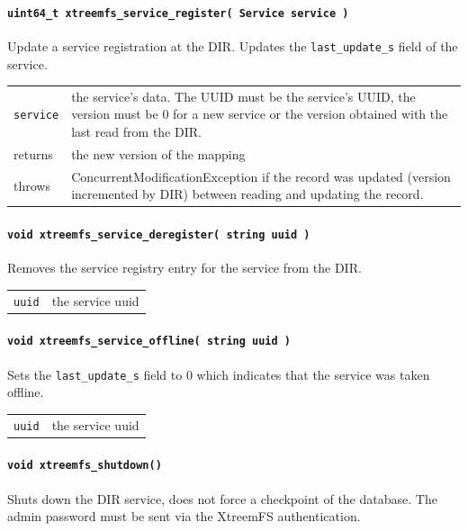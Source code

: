\paragraph{\texttt{uint64\_t xtreemfs\_service\_register( Service service~)}}
Update a service registration at the DIR. Updates the \texttt{last\_update\_s} field of the service.

\begin{tabularx}{\textwidth}{lX}
 \texttt{service} & the service's data. The UUID must be the service's UUID, the version must be 0 for a new service or the version obtained with the last read from the DIR\index{DIR}.\\
 returns & the new version of the mapping\\
 throws & ConcurrentModificationException if the record was updated (version incremented by DIR\index{DIR}) between reading and updating the record.\\
\end{tabularx}


\paragraph{\texttt{void xtreemfs\_service\_deregister( string uuid~)}}
Removes the service registry entry for the service from the DIR.

\begin{tabularx}{\textwidth}{lX}
 \texttt{uuid} & the service uuid\\
\end{tabularx}


\paragraph{\texttt{void xtreemfs\_service\_offline( string uuid~)}}
Sets the \texttt{last\_update\_s} field to 0 which indicates that the service was taken offline.

\begin{tabularx}{\textwidth}{lX}
 \texttt{uuid} & the service uuid\\
\end{tabularx}


\paragraph{\texttt{void xtreemfs\_shutdown()}}
Shuts down the DIR service, does not force a checkpoint of the database. The admin password must be sent via the XtreemFS authentication.




